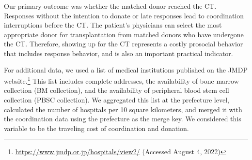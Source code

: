 \documentclass[12pt, a4paper]{article}
\begin{document}
Our primary outcome was whether the matched donor reached the CT. Responses without the intention to donate or late responses lead to coordination interruptions before the CT. The patient's physicians can select the most appropriate donor for transplantation from matched donors who have undergone the CT. Therefore, showing up for the CT represents a costly prosocial behavior that includes response behavior, and is also an important practical indicator.

For additional data, we used a list of medical institutions published on the JMDP website.\footnote{\url{https://www.jmdp.or.jp/hospitals/view2/} (Accessed August 4, 2022)} This list includes complete addresses, the availability of bone marrow collection (BM collection), and the availability of peripheral blood stem cell collection (PBSC collection). We aggregated this list at the prefecture level, calculated the number of hospitals per 10 square kilometers, and merged it with the coordination data using the prefecture as the merge key. We considered this variable to be the traveling cost of coordination and donation.
\end{document}
